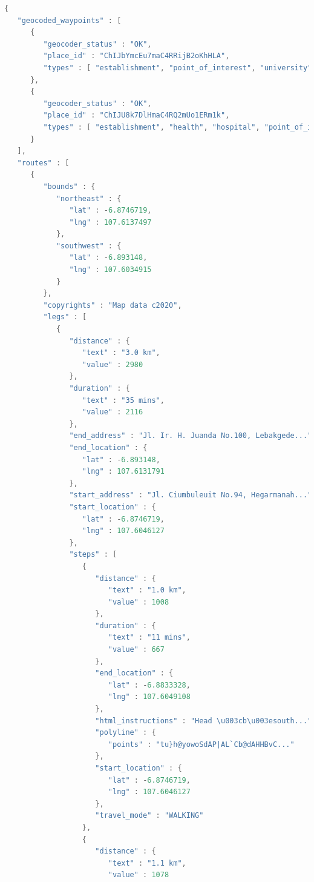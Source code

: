 \begin{lstlisting}[caption={Hasil Pemanggilan \textit{Directions API} yang Berhasil},label={list:success_directions},language=java]
{
   "geocoded_waypoints" : [
      {
         "geocoder_status" : "OK",
         "place_id" : "ChIJbYmcEu7maC4RRijB2oKhHLA",
         "types" : [ "establishment", "point_of_interest", "university" ]
      },
      {
         "geocoder_status" : "OK",
         "place_id" : "ChIJU8k7DlHmaC4RQ2mUo1ERm1k",
         "types" : [ "establishment", "health", "hospital", "point_of_interest" ]
      }
   ],
   "routes" : [
      {
         "bounds" : {
            "northeast" : {
               "lat" : -6.8746719,
               "lng" : 107.6137497
            },
            "southwest" : {
               "lat" : -6.893148,
               "lng" : 107.6034915
            }
         },
         "copyrights" : "Map data c2020",
         "legs" : [
            {
               "distance" : {
                  "text" : "3.0 km",
                  "value" : 2980
               },
               "duration" : {
                  "text" : "35 mins",
                  "value" : 2116
               },
               "end_address" : "Jl. Ir. H. Juanda No.100, Lebakgede...",
               "end_location" : {
                  "lat" : -6.893148,
                  "lng" : 107.6131791
               },
               "start_address" : "Jl. Ciumbuleuit No.94, Hegarmanah...",
               "start_location" : {
                  "lat" : -6.8746719,
                  "lng" : 107.6046127
               },
               "steps" : [
                  {
                     "distance" : {
                        "text" : "1.0 km",
                        "value" : 1008
                     },
                     "duration" : {
                        "text" : "11 mins",
                        "value" : 667
                     },
                     "end_location" : {
                        "lat" : -6.8833328,
                        "lng" : 107.6049108
                     },
                     "html_instructions" : "Head \u003cb\u003esouth...",
                     "polyline" : {
                        "points" : "tu}h@yowoSdAP|AL`Cb@dAHHBvC..."
                     },
                     "start_location" : {
                        "lat" : -6.8746719,
                        "lng" : 107.6046127
                     },
                     "travel_mode" : "WALKING"
                  },
                  {
                     "distance" : {
                        "text" : "1.1 km",
                        "value" : 1078

\end{lstlisting}
